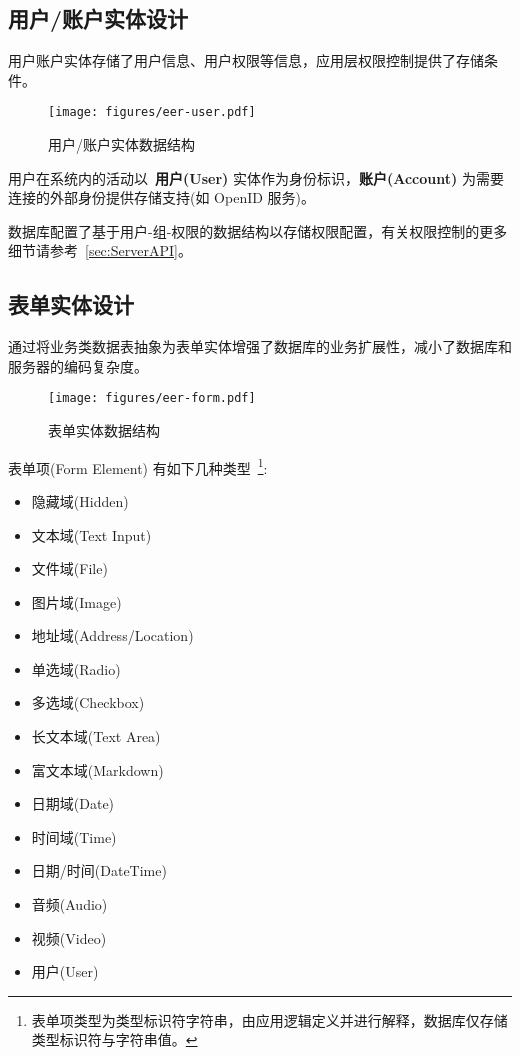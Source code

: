 \newpage

\subsection{用户/账户实体设计}

用户账户实体存储了用户信息、用户权限等信息，应用层权限控制提供了存储条件。

\begin{figure}[!h]
  \begin{center}
    \texttt{[image: figures/eer-user.pdf]}
    \caption{用户/账户实体数据结构\label{DatabaseEntityUser}}
  \end{center}
\end{figure}

用户在系统内的活动以~\textbf{用户(User)} 实体作为身份标识，\textbf{账户(Account)} 为需要连接的外部身份提供存储支持(如 OpenID 服务)。

数据库配置了基于用户-组-权限的数据结构以存储权限配置，有关权限控制的更多细节请参考~\ref{sec:ServerAPI}。

\newpage

\subsection{表单实体设计}

通过将业务类数据表抽象为表单实体增强了数据库的业务扩展性，减小了数据库和服务器的编码复杂度。

\begin{figure}[!h]
  \begin{center}
    \texttt{[image: figures/eer-form.pdf]}
    \caption{表单实体数据结构\label{DatabaseEntityForm}}
  \end{center}
\end{figure}

表单项(Form Element) 有如下几种类型~\footnote{表单项类型为类型标识符字符串，由应用逻辑定义并进行解释，数据库仅存储类型标识符与字符串值。}:

\begin{itemize}
  \item 隐藏域(Hidden)
  \item 文本域(Text Input)
  \item 文件域(File)
  \item 图片域(Image)
  \item 地址域(Address/Location)
  \item 单选域(Radio)
  \item 多选域(Checkbox)
  \item 长文本域(Text Area)
  \item 富文本域(Markdown)
  \item 日期域(Date)
  \item 时间域(Time)
  \item 日期/时间(DateTime)
  \item 音频(Audio)
  \item 视频(Video)
  \item 用户(User)
\end{itemize}

